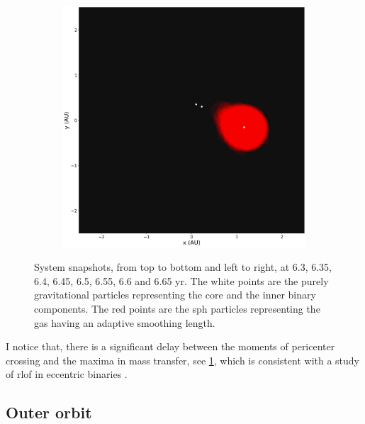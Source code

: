 \begin{figure}[H]
\begin{subfigure}[b]{0.47\textwidth}
    \end{subfigure}
    \hfill
    \begin{subfigure}[b]{0.47\textwidth}  
        \centering 
        \includegraphics[width=\textwidth]{Thesis/graphs/snapshot_0024170.png}
    \end{subfigure}
    \caption{System snapshots, from top to bottom and left to right, at 6.3, 6.35, 6.4, 6.45, 6.5, 6.55, 6.6 and 6.65 yr. The white points are the purely gravitational particles representing the core and the inner binary components. The red points are the \ac{sph} particles representing the gas having an adaptive smoothing length.}
    \label{fig:simualtion_snapshots}
\end{figure}

I notice that, there is a significant delay between the moments of pericenter crossing and the maxima in mass transfer, see \cref{fig:simualtion_snapshots}, which is consistent with a study of \ac{rlof} in eccentric binaries \citep{lajoie2010mass}.

\subsection{Outer orbit}

